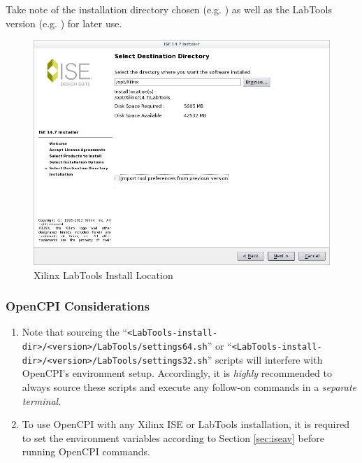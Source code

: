 \begin{flushleft}
\begin{flushleft}
\begin{enumerate}
\begin{figure}[H]
\end{figure}
\pagebreak
Take note of the installation directory chosen (e.g. ) as well as the LabTools version (e.g. ) for later use.
\begin{figure}[H]
	\centerline{\includegraphics[scale=0.4]{figures/xilinx_labtools_install_location}}
	\caption{Xilinx LabTools Install Location}
\end{figure}
\end{enumerate}

\subsubsection{OpenCPI Considerations}
\begin{enumerate}
\item Note that sourcing the ``\verb+<LabTools-install-dir>/<version>/LabTools/settings64.sh+'' or ``\verb+<LabTools-install-dir>/<version>/LabTools/settings32.sh+'' scripts will interfere with OpenCPI's environment setup. Accordingly, it is \textit{highly} recommended to always source these scripts and execute any follow-on commands in a \textit{separate terminal}.
\item To use OpenCPI with any Xilinx ISE or LabTools installation, it is required to set the environment variables according to Section \ref{sec:iseav} before running OpenCPI commands.
\end{enumerate}

\end{flushleft}
\pagebreak

\end{flushleft}

